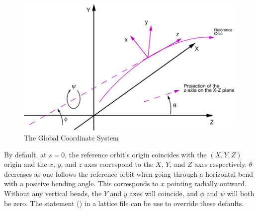 \begin{figure}[tb]
\centering
\includegraphics{global-coords.pdf}
\caption{The Global Coordinate System}
\label{f:global.coords}
\end{figure}

By default, at $s = 0$, the reference orbit's origin coincides with
the $(X, Y, Z)$ origin and the $x$, $y$, and $z$ axes correspond to
the $X$, $Y$, and $Z$ axes respectively. $\theta$ decreases as one
follows the reference orbit when going through a horizontal bend with
a positive bending angle. This corresponds to $x$ pointing radially
outward. Without any vertical bends, the $Y$ and $y$ axes will
coincide, and $\phi$ and $\psi$ will both be zero. The 
statement () in a lattice file can be use to
override these defaults.

